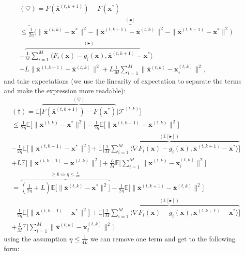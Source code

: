\begin{align*}
    (\heartsuit)  = F(\bar{\bm{x}}^{(t,k+1)}) - F(\bm{x}^*) \\ \leq \overbrace{ \frac{1}{2\eta} \Big(\|  \bar{\bm{x}}^{(t,k)} - \bm{x}^{*} \|^2 - \|  \bar{\bm{x}}^{(t,k+1)} - \bar{\bm{x}}^{(t,k)} \|^2 - \| \bar{\bm{x}}^{(t,k+1)} - \bm{x}^{*} \|^2 \Big)}^{(\blacktriangleleft)} \\
    + \overbrace{\frac{1}{M} \sum_{i=1}^M  \langle F_i(\bm{x}) - g_i(\bm{x})  ,\bar{\bm{x}}^{(t,k+1)} - \bm{x}^{*} \rangle  }^{(\blacktriangleright)}
    \\+ L  \|\bar{\bm{x}}^{(t,k+1)}-\bar{\bm{x}}^{(t,k)} \|^2  +L \frac{1}{M} \sum_{i=1}^M \|\bar{\bm{x}}^{(t,k)}-\bm{x}_i^{(t,k)} \|^2,
\end{align*}
\noindent
and take expectations (we use the linearity of expectation to separate the terms and make the expression more readable):
\begin{align*}
    (\dagger) = \mathbb{E} \Big[ \overbrace{F(\bar{\bm{x}}^{(t,k+1)}) - F(\bm{x}^*)}^{(\heartsuit)} | \mathcal{F}^{(t,k)}\Big]\\
    \leq \frac{1}{2\eta} \mathbb{E} \Bigg[
    \|  \bar{\bm{x}}^{(t,k)} - \bm{x}^{*} \|^2 \Bigg]
    -  \frac{1}{2\eta} \mathbb{E} \Bigg[ \|  \bar{\bm{x}}^{(t,k+1)} - \bar{\bm{x}}^{(t,k)} \|^2 \Bigg] \\
    - \frac{1}{2\eta}  \mathbb{E} \Bigg[ \| \bar{\bm{x}}^{(t,k+1)} - \bm{x}^{*} \|^2  \Bigg] 
    +  \overbrace{\mathbb{E} \Bigg[ \frac{1}{M} \sum_{i=1}^M  \langle \nabla F_i(\bm{x}) - g_i(\bm{x})  ,\bar{\bm{x}}^{(t,k+1)} - \bm{x}^{*} \rangle    \Bigg] }^{(\mathbb{E}[\blacktriangleright])}
    \\+ L \mathbb{E} \Bigg[ \|\bar{\bm{x}}^{(t,k+1)}-\bar{\bm{x}}^{(t,k)} \|^2  \Bigg]  + \frac{L}{M}  \mathbb{E} \Bigg[ \sum_{i=1}^M \|\bar{\bm{x}}^{(t,k)}-\bm{x}_i^{(t,k)} \|^2 \Bigg] \\
    = \overbrace{\left(\frac{1}{2\eta} + L \right) \mathbb{E} \Bigg[ 
        \|  \bar{\bm{x}}^{(t,k)} - \bm{x}^{*} \|^2 \Bigg]}^{\geq 0 \iff \eta \leq \frac{1}{4L}}
    -  \frac{1}{2\eta} \mathbb{E} \Bigg[  \|  \bar{\bm{x}}^{(t,k+1)} - \bar{\bm{x}}^{(t,k)} \|^2 \Bigg] \\
    - \frac{1}{2\eta}  \mathbb{E} \Bigg[  \| \bar{\bm{x}}^{(t,k+1)} - \bm{x}^{*} \|^2  \Bigg] 
    +  \overbrace{\mathbb{E} \Bigg[ \frac{1}{M} \sum_{i=1}^M  \langle \nabla F_i(\bm{x}) - g_i(\bm{x})  ,\bar{\bm{x}}^{(t,k+1)} - \bm{x}^{*} \rangle    \Bigg] }^{(\mathbb{E}[\blacktriangleright])}
    \\+ \frac{L}{M}  \mathbb{E} \Bigg[ \sum_{i=1}^M \|\bar{\bm{x}}^{(t,k)}-\bm{x}_i^{(t,k)} \|^2 \Bigg] 
\end{align*}
using the assumption $\eta \leq \frac{1}{4L}$ we can remove one term and get to the following form: 

